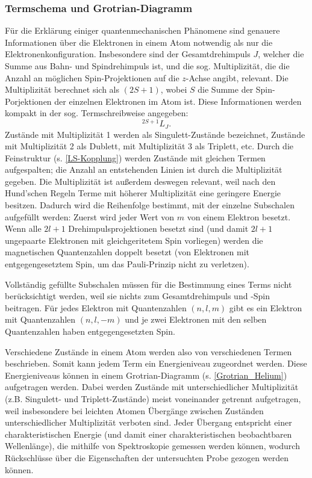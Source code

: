 \documentclass{article}
\begin{document}
\subsubsection{Termschema und Grotrian-Diagramm}

Für die Erklärung einiger quantenmechanischen Phänomene sind genauere Informationen
über die Elektronen in einem Atom notwendig als nur die Elektronenkonfiguration.
Insbesondere sind der Gesamtdrehimpuls $J$, welcher die Summe aus Bahn- und
Spindrehimpuls ist, und die sog. Multiplizität, die die Anzahl an möglichen
Spin-Projektionen auf die $z$-Achse angibt, relevant.
Die Multiplizität berechnet sich als $(2S + 1)$, wobei $S$ die Summe
der Spin-Porjektionen der einzelnen Elektronen im Atom ist.
Diese Informationen werden kompakt in der sog. Termschreibweise angegeben:
\[  
    {}^{2 S + 1} L_J.
\]
Zustände mit Multiplizität 1 werden als Singulett-Zustände bezeichnet,
Zustände mit Multiplizität 2 als Dublett, mit Multiplizität 3 als Triplett, etc.
Durch die Feinstruktur (s. \ref{LS-Kopplung}) werden Zustände mit gleichen Termen 
aufgespalten; die Anzahl an entstehenden Linien ist durch die Multiplizität gegeben.
Die Multiplizität ist außerdem deswegen relevant, weil nach den Hund'schen
Regeln Terme mit höherer Multiplizität eine geringere Energie besitzen.
Dadurch wird die Reihenfolge bestimmt, mit der einzelne Subschalen aufgefüllt werden:
Zuerst wird jeder Wert von $m$ von einem Elektron besetzt.
Wenn alle $2l + 1$ Drehimpulsprojektionen besetzt sind (und damit $2l + 1$
ungepaarte Elektronen mit gleichgeritetem Spin vorliegen) werden die
magnetischen Quantenzahlen doppelt besetzt (von Elektronen mit entgegengesetztem
Spin, um das Pauli-Prinzip nicht zu verletzen).

Vollständig gefüllte Subschalen müssen für die Bestimmung eines Terms nicht
berücksichtigt werden, weil sie nichts zum Gesamtdrehimpuls und -Spin beitragen.
Für jedes Elektron mit Quantenzahlen $(n, l, m)$ gibt es ein Elektron mit
Quantenzahlen $(n, l, -m)$ und je zwei Elektronen mit den selben Quantenzahlen
haben entgegengesetzten Spin.

Verschiedene Zustände in einem Atom werden also von verschiedenen Termen beschrieben.
Somit kann jedem Term ein Energieniveau zugeordnet werden. Diese Energieniveaus
können in einem Grotrian-Diagramm (s. \autoref{Grotrian_Helium}) aufgetragen werden.
Dabei werden Zustände mit unterschiedlicher Multiplizität
(z.B. Singulett- und Triplett-Zustände) meist voneinander getrennt aufgetragen,
weil insbesondere bei leichten Atomen Übergänge zwischen Zuständen unterschiedlicher 
Multiplizität verboten sind. Jeder Übergang entspricht einer charakteristischen
Energie (und damit einer charakteristischen beobachtbaren Wellenlänge),
die mithilfe von Spektroskopie gemessen werden können, wodurch Rückschlüsse
über die Eigenschaften der untersuchten Probe gezogen werden können.
\end{document}
